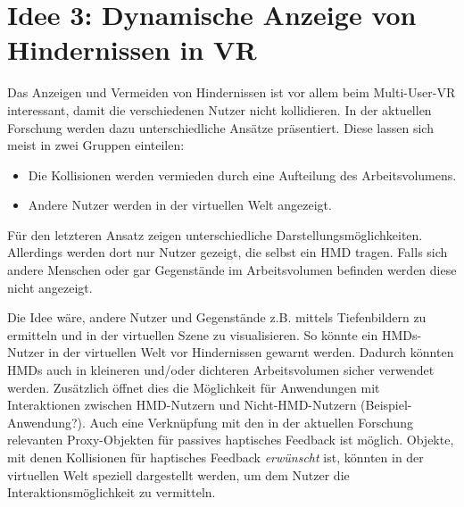 \documentclass[a4paper]{scrartcl}
\begin{document}
\section*{Idee 3: Dynamische Anzeige von Hindernissen in VR}
Das Anzeigen und Vermeiden von Hindernissen ist vor allem beim Multi-User-VR interessant, damit die verschiedenen Nutzer nicht kollidieren.
In der aktuellen Forschung werden dazu unterschiedliche Ansätze präsentiert.
Diese lassen sich meist in zwei Gruppen einteilen:
\begin{itemize}
	\item Die Kollisionen werden vermieden durch eine Aufteilung des Arbeitsvolumens.
	\item Andere Nutzer werden in der virtuellen Welt angezeigt.
\end{itemize}
Für den letzteren Ansatz zeigen \textcite{Lacoche2017} unterschiedliche Darstellungsmöglichkeiten.
Allerdings werden dort nur Nutzer gezeigt, die selbst ein HMD tragen.
Falls sich andere Menschen oder gar Gegenstände im Arbeitsvolumen befinden werden diese nicht angezeigt.

Die Idee wäre, andere Nutzer und Gegenstände z.B. mittels Tiefenbildern zu ermitteln und in der virtuellen Szene zu visualisieren.
So könnte ein HMDs-Nutzer in der virtuellen Welt vor Hindernissen gewarnt werden.
Dadurch könnten HMDs auch in kleineren und/oder dichteren Arbeitsvolumen sicher verwendet werden.
Zusätzlich öffnet dies die Möglichkeit für Anwendungen mit Interaktionen zwischen HMD-Nutzern und Nicht-HMD-Nutzern (Beispiel-Anwendung?).
Auch eine Verknüpfung mit den in der aktuellen Forschung relevanten Proxy-Objekten für passives haptisches Feedback ist möglich.
Objekte, mit denen Kollisionen für haptisches Feedback \emph{erwünscht} ist, könnten in der virtuellen Welt speziell dargestellt werden, um dem Nutzer die Interaktionsmöglichkeit zu vermitteln.

\printbibliography[nottype=online]
\printbibliography[title={Online Referenzen}, type=online]
\end{document}
